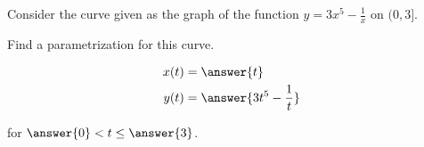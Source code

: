 \documentclass{ximera}
\author{Jason Miller}
\begin{document}
\begin{exercise}


Consider the curve given as the graph of the function $y=3x^5-\frac{1}{x}$ on $(0,3]$. 

Find a parametrization for this curve. 


\begin{align*}
x(t)&=\answer{t}\\
y(t)&=\answer{3t^5-\frac{1}{t}}
\end{align*}

for $\answer{0} < t \leq \answer{3} $. 


\end{exercise}
\end{document}
